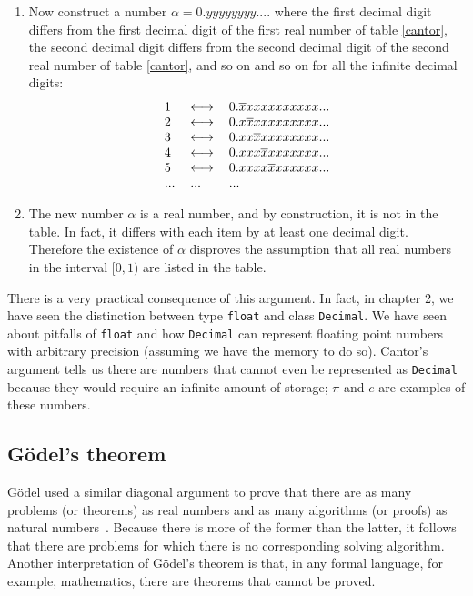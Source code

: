 \documentclass[justified,sixbynine]{tufte-book}
\def\ft{\small\tt}
\theoremstyle{plain}%
\theoremstyle{definition}
\theoremstyle{remark}
\begin{document}
\begin{fullwidth}
\begin{enumerate}
\item  Now construct a number $\alpha =0.yyyyyyyy....$ where the first
decimal digit differs from the first decimal digit of the first real number
of table \ref{cantor}, the second decimal digit differs from the second
decimal digit of the second real number of table \ref{cantor}, and so on and
so on for all the infinite decimal digits:
\begin{equation}
\begin{tabular}{lll}
1 & $\longleftrightarrow $ & $0.\overline{x}xxxxxxxxxx...$ \\
2 & $\longleftrightarrow $ & $0.x\overline{x}xxxxxxxxx...$ \\
3 & $\longleftrightarrow $ & $0.xx\overline{x}xxxxxxxx...$ \\
4 & $\longleftrightarrow $ & $0.xxx\overline{x}xxxxxxx...$ \\
5 & $\longleftrightarrow $ & $0.xxxx\overline{x}xxxxxx...$ \\
... & ... & ...
\end{tabular}
\label{cantor2}
\end{equation}

\item  The new number $\alpha $ is a real number, and by construction, it is
not in the table. In fact, it differs with each item by at least one decimal
digit. Therefore the existence of $\alpha $ disproves the assumption that
all real numbers in the interval $[0,1)$ are listed in the table.
\end{enumerate}

There is a very practical consequence of this argument. In fact, in chapter 2, we have seen the distinction between type {\ft float} and class {\ft Decimal}. We have seen about pitfalls of {\ft float} and how {\ft Decimal} can represent floating point numbers with arbitrary precision (assuming we have the memory to do so). Cantor's argument tells us there are numbers that cannot even be represented as {\ft Decimal} because they would require an infinite amount of storage; $\pi$ and $e$ are examples of these numbers.

\subsection{G\"odel's theorem}


G\"odel used a similar diagonal argument to prove that there are as many
problems (or theorems) as real numbers and as many algorithms (or proofs) as
natural numbers~\cite{hofstadter}. Because there is more of the former than the latter, it
follows that there are problems for which there is no corresponding solving
algorithm. Another interpretation of G\"odel's theorem is that, in any formal
language, for example, mathematics, there are theorems that cannot be proved.


\end{fullwidth}
\end{document}

